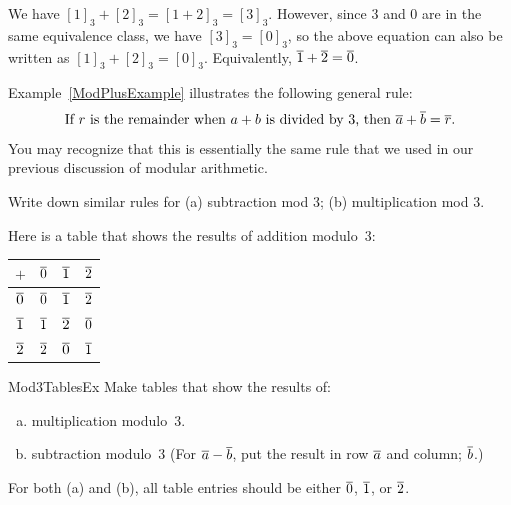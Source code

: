 \begin{eg}\label{ModPlusExample}
We have $[1]_3 + [2]_3 = [1 + 2]_3 = [3]_3$. However, since 3 and 0 are in the same equivalence class, we have $[3]_3 = [0]_3$, so the above equation can also be written as $[1]_3 + [2]_3 = [0]_3$. Equivalently, $\overline{1} + \overline{2} = \overline{0}$.
\end{eg}

Example~\ref{ModPlusExample} illustrates the following general rule:
$$ \text{%
 If $r$ is the remainder when $a + b$ is divided by $3$, then $\class{a} + \class{b} = \class{r}$.} $$
You may recognize that this is essentially the same rule that we used in our previous discussion of modular arithmetic.

\begin{exercise}{47}
Write down similar rules for (a) subtraction mod 3; (b) multiplication mod 3.
\end{exercise}

\begin{eg}
Here is a table that shows the results of addition modulo~$3$:
\begin{center} \begin{tabular}{c|c c c}
$+$&$\overline{0}$&$\overline{1}$&$\overline{2}$\\ \hline
$\overline{0}$&$\overline{0}$&$\overline{1}$&$\overline{2}$ \\
$\overline{1}$&$\overline{1}$&$\overline{2}$&$\overline{0}$ \\
$\overline{2}$&$\overline{2}$&$\overline{0}$&$\overline{1}$ \\
\end{tabular}
\end{center}
\end{eg}


\begin{exercise}{Mod3TablesEx}
Make tables that show the results of:
\begin{enumerate}[(a)]
\item \label{Mod3TablesEx-multiplication}
multiplication modulo~$3$.
\item \label{Mod3TablesEx-subtraction}
subtraction modulo~$3$ (For $\overline{a} - \overline{b}$,  put the result in row $\overline{a}$ and column; $\overline{b}$.)
\end{enumerate}
For both (a) and (b), all table entries should be  either $\overline{0}$, $\overline{1}$, or $\overline{2}$.
\end{exercise}



